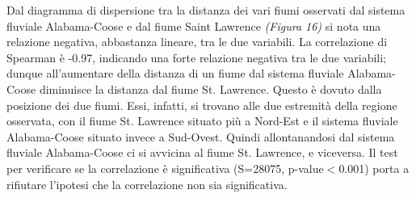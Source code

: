 \documentclass{article} %
\begin{document}
Dal diagramma di dispersione tra la distanza dei vari fiumi osservati dal sistema fluviale Alabama-Coose e dal fiume Saint Lawrence \textit{(Figura 16)} si nota una relazione negativa, abbastanza lineare, tra le due variabili.  
La correlazione di Spearman è -0.97, indicando una forte relazione negativa tra le due variabili; dunque all'aumentare della distanza di un fiume dal sistema fluviale Alabama-Coose diminuisce la distanza dal fiume St. Lawrence. 
Questo è dovuto dalla posizione dei due fiumi. Essi, infatti, si trovano alle due estremità della regione osservata, con il fiume St. Lawrence situato più a Nord-Est e il sistema fluviale Alabama-Coose situato invece a Sud-Ovest. Quindi allontanandosi dal sistema fluviale Alabama-Coose ci si avvicina al fiume St. Lawrence, e viceversa.
Il test per verificare se la correlazione è significativa (S=28075, p-value$<$0.001) porta a rifiutare l'ipotesi che la correlazione non sia significativa.
\end{document}
